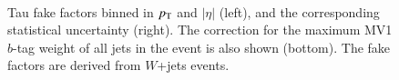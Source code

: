 \begin{figure}[htbp]
	\centering
	\hfill
	 \\
\caption{\label{fig:taufakefactors} Tau fake factors binned in $p_{\text{T}}$ and $|\eta|$ (left), and the corresponding statistical uncertainty (right). The correction for the maximum MV1 $b$-tag weight of all jets in the event is also shown (bottom). The fake factors are derived from $W$+jets events.}
\end{figure}


